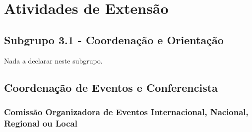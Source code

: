 \documentclass[a4paper,oneside,10pt]{article}
\begin{document}
\newpage
\section{Atividades de Extens\~{a}o}

\subsection{Subgrupo 3.1 - Coordenação e Orientação}
\vspace{0.3cm}

Nada a declarar neste subgrupo.

%
%

\subsection{Coordenação de Eventos e Conferencista}
\vspace{0.3cm}


\subsubsection{Comiss\~{a}o Organizadora de Eventos Internacional, Nacional, Regional ou Local}
\vspace{0.3cm}
\end{document}
